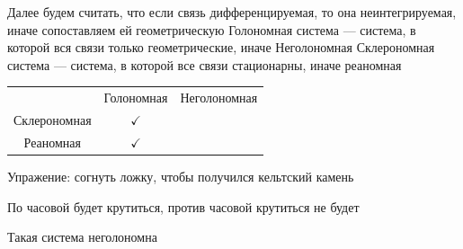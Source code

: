 \documentclass[crop=false]{standalone}
\begin{document}
\noindent \keypoint Далее будем считать, что если связь дифференцируемая, то она неинтегрируемая, иначе сопоставляем ей геометрическую
\Def Голономная система — система, в которой вся связи только геометрические, иначе Неголономная
\Def Склерономная система — система, в которой все связи стационарны, иначе реаномная
\begin{table}
    \begin{tabular}{c|c|c}
      & Голономная & Неголономная \\
      Склерономная & $\checkmark$  & \\
      Реаномная & $\checkmark$  &   
    \end{tabular}
\end{table}
Упражение: согнуть ложку, чтобы получился кельтский камень

По часовой будет крутиться, против часовой крутиться не будет

Такая система неголономна
\end{document}
